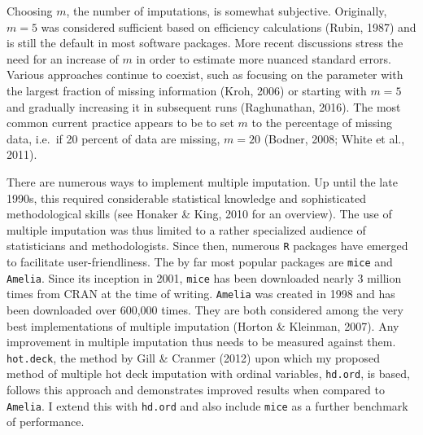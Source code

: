\documentclass[12pt,econ]{sources/authesis}
\begin{document}
Choosing \(m\), the number of imputations, is somewhat subjective. Originally, \(m = 5\) was considered sufficient based on efficiency calculations (Rubin, 1987) and is still the default in most software packages. More recent discussions stress the need for an increase of \(m\) in order to estimate more nuanced standard errors. Various approaches continue to coexist, such as focusing on the parameter with the largest fraction of missing information (Kroh, 2006) or starting with \(m = 5\) and gradually increasing it in subsequent runs (Raghunathan, 2016). The most common current practice appears to be to set \(m\) to the percentage of missing data, i.e.~if 20 percent of data are missing, \(m = 20\) (Bodner, 2008; White et al., 2011).

There are numerous ways to implement multiple imputation. Up until the late 1990s, this required considerable statistical knowledge and sophisticated methodological skills (see Honaker \& King, 2010 for an overview). The use of multiple imputation was thus limited to a rather specialized audience of statisticians and methodologists. Since then, numerous \texttt{R} packages have emerged to facilitate user-friendliness. The by far most popular packages are \texttt{mice} and \texttt{Amelia}. Since its inception in 2001, \texttt{mice} has been downloaded nearly 3 million times from CRAN at the time of writing. \texttt{Amelia} was created in 1998 and has been downloaded over 600,000 times. They are both considered among the very best implementations of multiple imputation (Horton \& Kleinman, 2007). Any improvement in multiple imputation thus needs to be measured against them. \texttt{hot.deck}, the method by Gill \& Cranmer (2012) upon which my proposed method of multiple hot deck imputation with ordinal variables, \texttt{hd.ord}, is based, follows this approach and demonstrates improved results when compared to \texttt{Amelia}. I extend this with \texttt{hd.ord} and also include \texttt{mice} as a further benchmark of performance.
\end{document}
